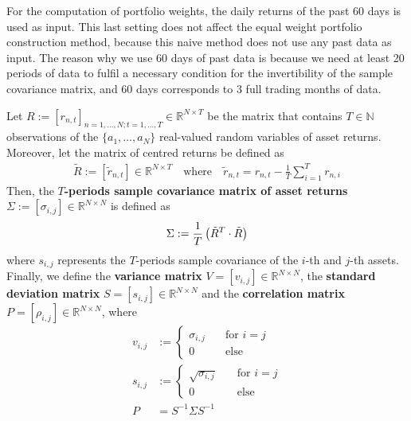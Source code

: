         For the computation of portfolio weights, the daily returns of the past 60 days is used as input. This last setting does not affect the equal weight portfolio construction method, because this naive method does not use any past data as input. The reason why we use 60 days of past data is because we need at least 20 periods of data to fulfil a necessary condition for the invertibility of the sample covariance matrix, and 60 days corresponds to 3 full trading months of data.
        
        \begin{definition}\label{covmatrixdefition}
           Let $R := [r_{n,t}]_{n = 1, \dots, N; t = 1, \dots, T} \in \mathbb{R}^{N \times T}$ be the matrix that contains $T \in \mathbb{N}$ observations of the $\{ a_1, \dots, a_N \}$ real-valued random variables of asset returns. Moreover, let the matrix of centred returns be defined as
           \begin{align*}
               \tilde{R} := [\tilde{r}_{n,t}] \in \mathbb{R}^{N \times T} \quad \text{where} \quad \tilde{r}_{n,t} = r_{n,t} - \frac{1}{T} \sum_{i=1}^T r_{n,i}
           \end{align*}
           Then, the \textbf{$T$-periods sample covariance matrix of asset returns} $\Sigma := [\sigma_{i,j}] \in \mathbb{R}^{N \times N}$ is defined as
           \begin{align*}
               \Sigma := \frac{1}{T} \left( \Tilde{R}^T \cdot \Tilde{R} \right)
           \end{align*}
           where $s_{i,j}$ represents the $T$-periods sample covariance of the $i$-th and $j$-th assets. Finally, we define the \textbf{variance matrix} $V = [v_{i,j}] \in \mathbb{R}^{N \times N}$, the \textbf{standard deviation matrix} $S = [s_{i,j}] \in \mathbb{R}^{N \times N}$ and the \textbf{correlation matrix} $P = [\rho_{i,j}] \in \mathbb{R}^{N \times N}$, where
           \begin{align*}
               v_{i,j} &:= \begin{cases}
                    \sigma_{i,j}            &\quad \text{for } i=j \\
                    0                       &\quad \text{else}
               \end{cases} \\
               s_{i,j} &:= \begin{cases}
                    \sqrt{\sigma_{i,j}}     &\quad \text{for } i=j \\
                    0                       &\quad \text{else}
               \end{cases} \\
               P &= S^{-1} \Sigma S^{-1}
           \end{align*}
        \end{definition}
        
